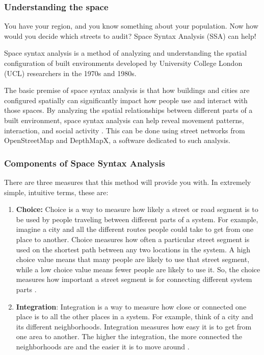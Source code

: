 \documentclass[
]{latex/krantz}
\begin{document}
\hypertarget{understanding-the-space}{%
\subsubsection{Understanding the space}\label{understanding-the-space}}

You have your region, and you know something about your population. Now how would you decide which streets to audit? Space Syntax Analysis (SSA) can help!

Space syntax analysis is a method of analyzing and understanding the spatial configuration of built environments developed by University College London (UCL) researchers in the 1970s and 1980s.

The basic premise of space syntax analysis is that how buildings and cities are configured spatially can significantly impact how people use and interact with those spaces. By analyzing the spatial relationships between different parts of a built environment, space syntax analysis can help reveal movement patterns, interaction, and social activity \autocite{vannesIntroductionSpaceSyntax2021}. This can be done using street networks from OpenStreetMap and DepthMapX, a software dedicated to such analysis.

\hypertarget{components-of-space-syntax-analysis}{%
\subsubsection{Components of Space Syntax Analysis}\label{components-of-space-syntax-analysis}}

There are three measures that this method will provide you with. In extremely simple, intuitive terms, these are:

\begin{enumerate}
\def\labelenumi{\arabic{enumi}.}
\item
  \textbf{Choice:} Choice is a way to measure how likely a street or road segment is to be used by people traveling between different parts of a system. For example, imagine a city and all the different routes people could take to get from one place to another. Choice measures how often a particular street segment is used on the shortest path between any two locations in the system. A high choice value means that many people are likely to use that street segment, while a low choice value means fewer people are likely to use it. So, the choice measures how important a street segment is for connecting different system parts \autocite{hillierSocialLogicSpace1984}.
\item
  \textbf{Integration}: Integration is a way to measure how close or connected one place is to all the other places in a system. For example, think of a city and its different neighborhoods. Integration measures how easy it is to get from one area to another. The higher the integration, the more connected the neighborhoods are and the easier it is to move around \autocite{hillierSocialLogicSpace1984}.
\end{enumerate}
\end{document}
